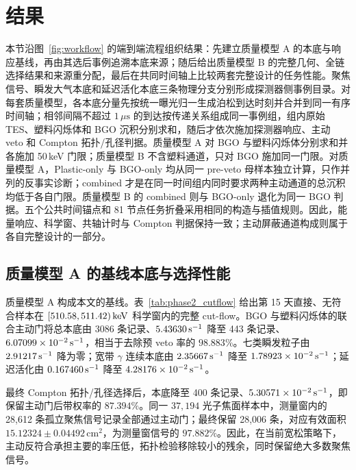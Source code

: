 
\section{结果}
\label{sec:results}

本节沿图~\ref{fig:workflow} 的端到端流程组织结果：先建立质量模型 A 的本底与响应基线，再由其选后事例追溯本底来源；随后给出质量模型 B 的完整几何、全链选择结果和来源重分配，最后在共同时间轴上比较两套完整设计的任务性能。聚焦信号、瞬发大气本底和延迟活化本底三条物理分支分别形成探测器侧事例目录。对每套质量模型，各本底分量先按统一曝光归一生成泊松到达时刻并合并到同一有序时间轴；相邻间隔不超过 $1\,\mu\mathrm{s}$ 的到达按传递关系组成同一事例组，组内原始 TES、塑料闪烁体和 BGO 沉积分别求和，随后才依次施加探测器响应、主动 veto 和 Compton 拓扑/孔径判据。质量模型 A 对 BGO 与塑料闪烁体分别求和并各施加 50\,keV 门限；质量模型 B 不含塑料通道，只对 BGO 施加同一门限。对质量模型 A，Plastic-only 与 BGO-only 均从同一 pre-veto 母样本独立计算，只作并列的反事实诊断；combined 才是在同一时间组内同时要求两种主动通道的总沉积均低于各自门限。质量模型 B 的 combined 则与 BGO-only 退化为同一 BGO 判据。五个公共时间锚点和 81 节点任务折叠采用相同的构造与插值规则。因此，能量响应、科学窗、共轴计时与 Compton 判据保持一致；主动屏蔽通道构成则属于各自完整设计的一部分。

\subsection{质量模型 A 的基线本底与选择性能}
\label{subsec:model_a_baseline_zh}
\label{subsec:reference_background_results_zh}

质量模型 A 构成本文的基线。表~\ref{tab:phase2_cutflow} 给出第 15 天直接、无符合样本在 $[510.58,511.42)\,\mathrm{keV}$ 科学窗内的完整 cut-flow。BGO 与塑料闪烁体的联合主动门将总本底由 3086 条记录、$5.43630\,\mathrm{s^{-1}}$ 降至 443 条记录、$6.07099\times10^{-2}\,\mathrm{s^{-1}}$，相当于去除预 veto 率的 $98.883\%$。七类瞬发粒子由 $2.91217\,\mathrm{s^{-1}}$ 降为零；宽带 $\gamma$ 连续本底由 $2.35667\,\mathrm{s^{-1}}$ 降至 $1.78923\times10^{-2}\,\mathrm{s^{-1}}$；延迟活化由 $0.167460\,\mathrm{s^{-1}}$ 降至 $4.28176\times10^{-2}\,\mathrm{s^{-1}}$。

最终 Compton 拓扑/孔径选择后，本底降至 400 条记录、$5.30571\times10^{-2}\,\mathrm{s^{-1}}$，即保留主动门后带权率的 $87.394\%$。同一 $37{,}194$ 光子焦面样本中，测量窗内的 28,612 条孤立聚焦信号记录全部通过主动门；最终保留 28,006 条，对应有效面积 $15.12324\pm0.04492\,\mathrm{cm^2}$，为测量窗信号的 $97.882\%$。因此，在当前宽松策略下，主动反符合承担主要的率压低，拓扑检验移除较小的残余，同时保留绝大多数聚焦信号。

